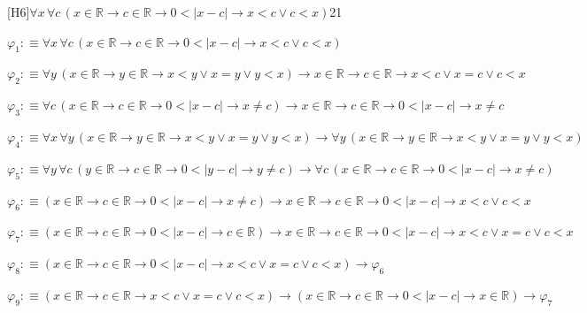 \begin{fullproof}{[H6]}{$\forall x\,\forall c\,(x \in \mathbb{R} \to c \in \mathbb{R} \to 0 < \lvert x - c \rvert \to x < c \lor c < x)$}{21}
\begin{abbrevlist}
\item $\varphi_{1} :\equiv \forall x\,\forall c\,(x \in \mathbb{R} \to c \in \mathbb{R} \to 0 < \lvert x - c \rvert \to x < c \lor c < x)$
\item $\varphi_{2} :\equiv \forall y\,(x \in \mathbb{R} \to y \in \mathbb{R} \to x < y \lor x = y \lor y < x) \to x \in \mathbb{R} \to c \in \mathbb{R} \to x < c \lor x = c \lor c < x$
\item $\varphi_{3} :\equiv \forall c\,(x \in \mathbb{R} \to c \in \mathbb{R} \to 0 < \lvert x - c \rvert \to x \neq c) \to x \in \mathbb{R} \to c \in \mathbb{R} \to 0 < \lvert x - c \rvert \to x \neq c$
\item $\varphi_{4} :\equiv \forall x\,\forall y\,(x \in \mathbb{R} \to y \in \mathbb{R} \to x < y \lor x = y \lor y < x) \to \forall y\,(x \in \mathbb{R} \to y \in \mathbb{R} \to x < y \lor x = y \lor y < x)$
\item $\varphi_{5} :\equiv \forall y\,\forall c\,(y \in \mathbb{R} \to c \in \mathbb{R} \to 0 < \lvert y - c \rvert \to y \neq c) \to \forall c\,(x \in \mathbb{R} \to c \in \mathbb{R} \to 0 < \lvert x - c \rvert \to x \neq c)$
\item $\varphi_{6} :\equiv (x \in \mathbb{R} \to c \in \mathbb{R} \to 0 < \lvert x - c \rvert \to x \neq c) \to x \in \mathbb{R} \to c \in \mathbb{R} \to 0 < \lvert x - c \rvert \to x < c \lor c < x$
\item $\varphi_{7} :\equiv (x \in \mathbb{R} \to c \in \mathbb{R} \to 0 < \lvert x - c \rvert \to c \in \mathbb{R}) \to x \in \mathbb{R} \to c \in \mathbb{R} \to 0 < \lvert x - c \rvert \to x < c \lor x = c \lor c < x$
\item $\varphi_{8} :\equiv (x \in \mathbb{R} \to c \in \mathbb{R} \to 0 < \lvert x - c \rvert \to x < c \lor x = c \lor c < x) \to \varphi_{6}$
\item $\varphi_{9} :\equiv (x \in \mathbb{R} \to c \in \mathbb{R} \to x < c \lor x = c \lor c < x) \to (x \in \mathbb{R} \to c \in \mathbb{R} \to 0 < \lvert x - c \rvert \to x \in \mathbb{R}) \to \varphi_{7}$
\end{abbrevlist}
\end{fullproof}
